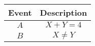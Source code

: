 \begin{center}
	\begin{tabular}{|c|c|} 
		\hline
		Event & Description \\
		\hline
		$A$ & $X+Y=4$\\
		\hline
		$B$ & $X\ne Y$\\
		\hline
	\end{tabular}
\end{center}